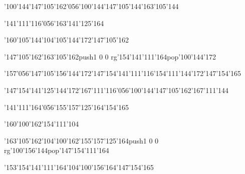 \null\vfill\ipa\centerline{\enskip\enskip\enskip\enskip\enskip\enskip\enskip\enskip\char'100\char'144\enskip\char'147\char'105\char'162\char'056\char'100\char'144\enskip\enskip\enskip\char'147\char'105\char'144\enskip\char'163\char'105\char'144}\medskip\centerline{\enskip\char'141\char'111\char'116\char'056\char'163\char'141\char'125\char'164\enskip\enskip\enskip\enskip\enskip\enskip\enskip\enskip\enskip\enskip\enskip\enskip\enskip\enskip\enskip}\medskip\centerline{\enskip\char'160\char'105\char'144\enskip\enskip\enskip\enskip\char'104\char'105\char'144\char'172\enskip\enskip\enskip\char'147\char'105\char'162}\medskip\centerline{\enskip\enskip\enskip\enskip\char'147\char'105\char'162\enskip\char'163\char'105\char'162\enskip\pdfcolorstack\match push{1 0 0 rg}\char'154\char'141\char'111\char'164\pdfcolorstack\match pop{}\enskip\char'100\char'144\char'172\enskip\enskip\enskip\enskip\enskip}\medskip\centerline{\enskip\char'157\char'056\char'147\char'105\char'156\char'144\char'172\enskip\enskip\enskip\char'147\char'154\char'141\char'111\char'116\enskip\enskip\enskip\enskip\enskip\enskip\char'154\char'111\char'144\char'172\enskip\char'147\char'154\char'165}\medskip\vfill\footline{\hfil\tt\folio\hfil}\eject
\null\vfill\ipa\centerline{\enskip\char'147\char'154\char'141\char'125\char'144\char'172\enskip\enskip\enskip\enskip\char'167\char'111\char'116\char'056\char'100\char'144\enskip\enskip\enskip\char'147\char'105\char'162\enskip\char'167\char'111\char'144}\medskip\centerline{\enskip\char'141\char'111\char'164\char'056\char'155\char'157\char'125\char'164\enskip\char'154\char'165\enskip\enskip\enskip\enskip\enskip\enskip\enskip\enskip\enskip\enskip\enskip\enskip}\medskip\centerline{\enskip\char'160\char'100\char'162\enskip\enskip\enskip\enskip\enskip\enskip\enskip\enskip\enskip\enskip\enskip\char'154\char'111\char'104}\medskip\centerline{\enskip\enskip\enskip\enskip\char'163\char'105\char'162\enskip\char'104\char'100\char'162\enskip\char'155\char'157\char'125\char'164\enskip\pdfcolorstack\match push{1 0 0 rg}\char'100\char'156\char'144\pdfcolorstack\match pop{}\enskip\char'147\char'154\char'111\char'164}\medskip\centerline{\enskip\enskip\enskip\enskip\enskip\enskip\enskip\enskip\enskip\enskip\char'153\char'154\char'141\char'111\char'164\enskip\enskip\enskip\enskip\enskip\enskip\char'104\char'100\char'156\char'164\enskip\char'147\char'154\char'165}\medskip\vfill\footline{\hfil\tt\folio\hfil}\eject
